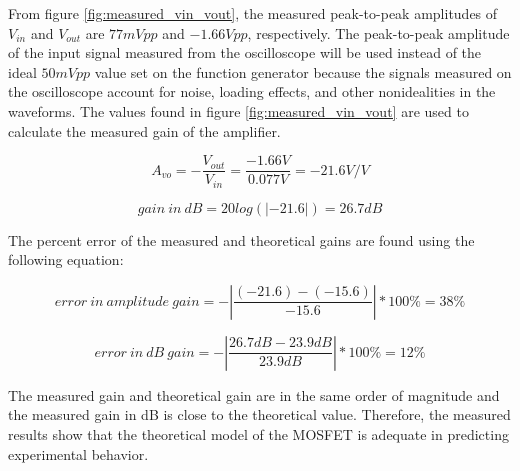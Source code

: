 From figure \ref{fig:measured_vin_vout}, the measured peak-to-peak amplitudes of $V_{in}$ and $V_{out}$ are $77 mVpp$ and $-1.66 Vpp$, respectively.
The peak-to-peak amplitude of the input signal measured from the oscilloscope will be used instead of the ideal $50 mVpp$ value set on the function generator because the signals measured on the oscilloscope account for noise, loading effects, and other nonidealities in the waveforms.
The values found in figure \ref{fig:measured_vin_vout} are used to calculate the measured gain of the amplifier.

\FloatBarrier

\begin{equation}
	\label{eq:measured_gain}
	A_{vo} = - \frac{V_{out}}{V_{in}} = \frac{-1.66 V}{0.077 V} = -21.6 V/V
\end{equation}

\begin{equation}
	\label{eq:measured_gain_db}
	gain \ in \ dB = 20 log(|-21.6|) = 26.7 dB
\end{equation}

\FloatBarrier

The percent error of the measured and theoretical gains are found using the following equation:

\begin{equation}
	\label{eq:error}
	error \ in \ amplitude \ gain = - |\frac{(-21.6) - (-15.6)}{-15.6}| * 100\% = 38\%
\end{equation}

\begin{equation}
	\label{eq:error_db}
        error \ in \ dB \ gain = - |\frac{26.7 dB - 23.9 dB}{23.9 dB}| * 100\% = 12\%
\end{equation}

 The measured gain and theoretical gain are in the same order of magnitude and the measured gain in dB is close to the theoretical value.
 Therefore, the measured results show that the theoretical model of the MOSFET is adequate in predicting experimental behavior.
